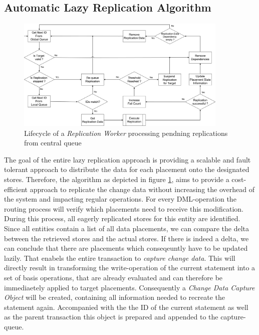 
\subsection{Automatic Lazy Replication Algorithm}
\label{sec:algo}

\begin{figure}[t] 
    \centering
    \includegraphics[width=0.9\textwidth]{Figures/flow_worker.png}
    \caption{Lifecycle of a \textit{Replication Worker} processing pendning replications from central queue}
    \label{fig:flow_worker}
\end{figure}

The goal of the entire lazy replication approach is providing a scalable and fault tolerant approach to distribute the data for each placement onto the designated stores.
Therefore, the algorithm as depicted in figure \ref{fig:flow_worker}, aims to provide a cost-efficient approach to replicate the change data without increasing 
the overhead of the system and impacting regular operations. 
For every DML-operation the routing process will verify which placements need to receive this modification. During this process, all eagerly replicated stores for this entity
are identified. Since all entities contain a list of all data placements, we can compare the delta between the retrieved stores and the actual stores. 
If there is indeed a delta, we can conclude that there are placements which conseqeuntly have to be updated lazily. 
That enabels the entire transaction to \emph{capture change data}. This will directly result in transforming the write-operation of the current statement into a set of basis 
operations, that are already evaluated and can therefore be immediaetely applied to target placements. Consequently a \emph{Change Data Capture Object} will be created, 
containing all information needed to recreate the statement again. Accompanied with the the ID of the current statement as well as the parent transaction this object is prepared
and appended to the capture-queue.\\

